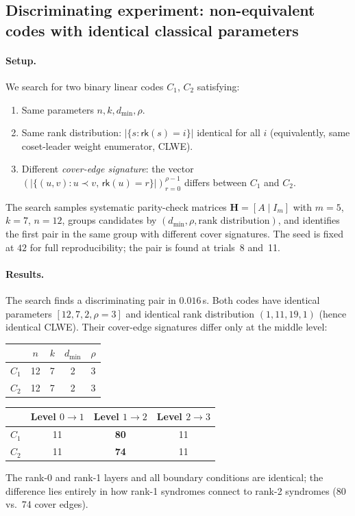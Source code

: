 \documentclass[11pt,twoside,leqno]{article}
\theoremstyle{definition}
\theoremstyle{plain}
\theoremstyle{remark}
\newcommand{\rk}{\mathsf{rk}}
\newcommand{\HH}{\mathbf{H}}
\newcommand{\covrad}{\rho}
\begin{document}
\subsection{Discriminating experiment: non-equivalent codes with identical classical parameters}
\label{sec:res:discriminating}

\paragraph{Setup.}
We search for two binary linear codes $C_1$, $C_2$ satisfying:
\begin{enumerate}[leftmargin=*,itemsep=1pt,label=(\roman*)]
\item Same parameters $n,k,d_{\min},\covrad$.
\item Same rank distribution: $|\{s:\rk(s)=i\}|$ identical for all $i$
  (equivalently, same coset-leader weight enumerator, CLWE).
\item Different \emph{cover-edge signature}: the vector
  $(|\{(u,v):u\prec v,\,\rk(u)=r\}|)_{r=0}^{\covrad-1}$ differs between $C_1$ and $C_2$.
\end{enumerate}
The search samples systematic parity-check matrices $\HH=[A\mid I_m]$
with $m=5$, $k=7$, $n=12$, groups candidates by $(d_{\min},\covrad,\text{rank distribution})$,
and identifies the first pair in the same group with different cover signatures. The seed
is fixed at $42$ for full reproducibility; the pair is found at trials~8 and~11.

\paragraph{Results.}
The search finds a discriminating pair in $0.016$\,s.
Both codes have identical parameters $[12,7,2,\covrad=3]$ and identical rank distribution
$(1, 11, 19, 1)$ (hence identical CLWE). Their cover-edge signatures differ only at the
middle level:
\begin{center}
\begin{tabular}{lcccc}
\toprule
 & $n$ & $k$ & $d_{\min}$ & $\covrad$ \\
\midrule
$C_1$ & 12 & 7 & 2 & 3 \\
$C_2$ & 12 & 7 & 2 & 3 \\
\bottomrule
\end{tabular}
\qquad
\begin{tabular}{lccc}
\toprule
 & Level $0{\to}1$ & Level $1{\to}2$ & Level $2{\to}3$ \\
\midrule
$C_1$ & 11 & \textbf{80} & 11 \\
$C_2$ & 11 & \textbf{74} & 11 \\
\bottomrule
\end{tabular}
\end{center}
The rank-0 and rank-1 layers and all boundary conditions are identical; the difference
lies entirely in how rank-1 syndromes connect to rank-2 syndromes (80 vs.~74 cover edges).
\end{document}
